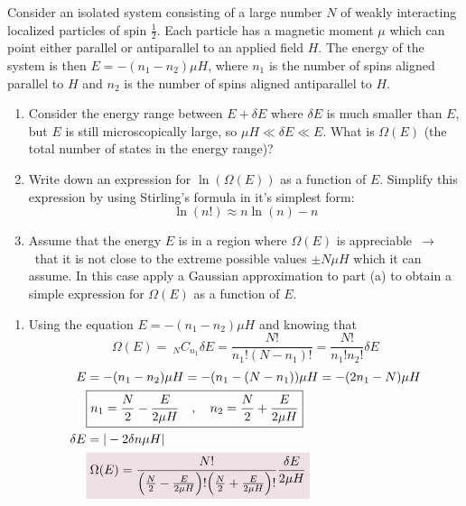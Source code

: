\documentclass{article}
\begin{document}
    \begin{problem}[Reif 2.4]
        Consider an isolated system consisting of a large number $N$ of weakly interacting localized particles of spin $\frac{1}{2}$. Each particle has a magnetic moment $\mu$ which can point either parallel or antiparallel to an applied field $H$. The energy of the system is then $E=-(n_1-n_2)\mu H$, where $n_1$ is the number of spins aligned parallel to $H$ and $n_2$ is the number of spins aligned antiparallel to $H$. 
        \begin{enumerate}[label=(\alph*)]
            \item Consider the energy range between $E+\delta E$ where $\delta E$ is much smaller than $E$, but $E$ is still microscopically large, so $\mu H \ll \delta E\ll E$. What is $\Omega(E)$ (the total number of states  in the energy range)?
            \item Write down an expression for $\ln(\Omega(E))$ as a function of $E$. Simplify this expression by using Stirling's formula in it's simplest form: $$\ln(n!)\approx n\ln(n)-n$$
            \item Assume that the energy $E$ is in a region where $\Omega(E)$ is appreciable~$\rightarrow$~that it is not close to the extreme possible values $\pm N\mu H$ which it can assume. In this case apply a Gaussian approximation to part (a) to obtain a simple expression for $\Omega(E)$ as a function of $E$.
        \end{enumerate}
        \answerline
        \begin{enumerate}[label=\alph*)]
            \item Using the equation $E=-(n_1-n_2)\mu H$ and knowing that \begin{equation*}
                \Omega(E)=~_NC_{n_1}\delta E=\frac{N!}{n_1!(N-n_1)!}=\frac{N!}{n_1!n_2!}\delta E
            \end{equation*}
            \begin{align*}
                E&=-(n_1-n_2)\mu H=-(n_1-(N-n_1))\mu H=-(2n_1-N)\mu H
                \\
                &\boxed{n_1=\frac{N}{2}-\frac{E}{2\mu H}\quad,\quad n_2=\frac{N}{2}+\frac{E}{2\mu H}}
                \\
                \delta E&=|-2\delta n\mu H|
                \\
                &\coloredanswer{\Omega(E)=\frac{N!}{\qty(\oo[N]{2}-\frac{E}{2\mu H})!\qty(\oo[N]{2}+\frac{E}{2\mu H})!}\frac{\delta E}{2\mu H}}
            \end{align*}

\end{enumerate}
\end{problem}
\end{document}
